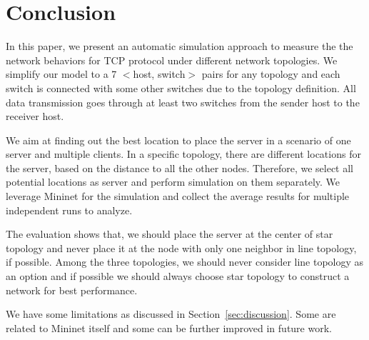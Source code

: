 \section{Conclusion} \label{sec:conclusion}

In this paper, we present an automatic simulation approach to measure the 
the network behaviors for TCP protocol under different network topologies. 
We simplify our model to a 7 $<$host, switch$>$ pairs for any topology and 
each switch is connected with some other switches due to the topology definition.
All data transmission goes through at least two switches from the sender 
host to the receiver host. 

We aim at finding out the best location to place the server in a scenario of one server 
and multiple clients. In a specific topology, there are different locations
for the server, based on the distance to all the other nodes. Therefore, we 
select all potential locations as server and perform simulation on them separately.
We leverage Mininet for the simulation and collect the average results 
for multiple independent runs to analyze. 

The evaluation shows that, we should place the server at the center 
of star topology and never place it at the node with only one neighbor 
in line topology, if possible. Among the three topologies, we should never 
consider line topology as an option and if possible we should always choose 
star topology to construct a network for best performance.

We have some limitations as discussed in Section~\ref{sec:discussion}. Some 
are related to Mininet itself and some can be further improved in future work.
